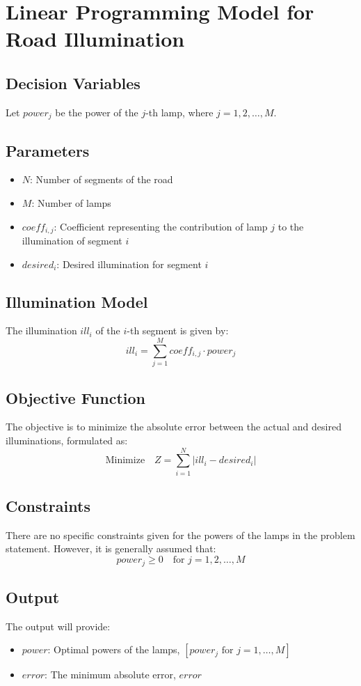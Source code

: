 \documentclass{article}
\begin{document}
\section*{Linear Programming Model for Road Illumination}

\subsection*{Decision Variables}
Let \( power_j \) be the power of the \( j \)-th lamp, where \( j = 1, 2, \ldots, M \).

\subsection*{Parameters}
\begin{itemize}
    \item \( N \): Number of segments of the road
    \item \( M \): Number of lamps
    \item \( coeff_{i,j} \): Coefficient representing the contribution of lamp \( j \) to the illumination of segment \( i \)
    \item \( desired_i \): Desired illumination for segment \( i \)
\end{itemize}

\subsection*{Illumination Model}
The illumination \( ill_i \) of the \( i \)-th segment is given by:
\[
ill_i = \sum_{j=1}^{M} coeff_{i,j} \cdot power_j
\]

\subsection*{Objective Function}
The objective is to minimize the absolute error between the actual and desired illuminations, formulated as:
\[
\text{Minimize} \quad Z = \sum_{i=1}^{N} |ill_i - desired_i|
\]

\subsection*{Constraints}
There are no specific constraints given for the powers of the lamps in the problem statement. However, it is generally assumed that:
\[
power_j \geq 0 \quad \text{for } j = 1, 2, \ldots, M
\]

\subsection*{Output}
The output will provide:
\begin{itemize}
    \item \( power \): Optimal powers of the lamps, \( [power_j \text{ for } j = 1, \ldots, M] \)
    \item \( error \): The minimum absolute error, \( error \)
\end{itemize}
\end{document}
